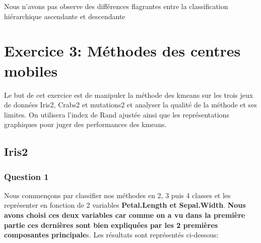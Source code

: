 \documentclass[10pt]{article}
\begin{document}
	Nous n'avons pas observe des différences flagrantes entre la classification hiérarchique ascendante et descendante
	
	\section{ Exercice 3: Méthodes des centres mobiles}
	Le but de cet exercice est de manipuler la méthode des kmeans sur les trois jeux de données Iris2, Crabs2 et mutations2 et analyser la qualité de la méthode et ses limites. On utilisera l'index de Rand ajustée ainsi que les représentations graphiques pour juger des performances des kmeans.
	\subsection{Iris2}
	\subsubsection{Question 1}
	Nous commençons par classifier nos méthodes en 2, 3 puis 4 classes et les représenter  en fonction de 2 variables \textbf{Petal.Length et Sepal.Width}. \textbf{Nous avons choisi ces deux variables  car comme on a vu dans la première partie ces dernières sont bien expliquées par les 2 premières composantes principale}s.  Les résultats sont représentés ci-dessous:\\
	
\end{document}
